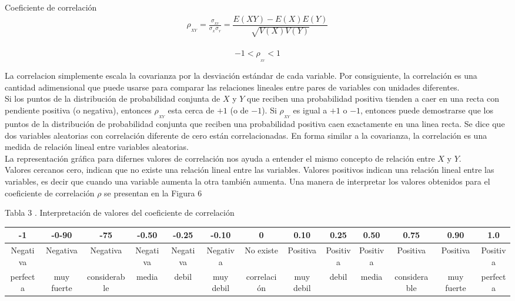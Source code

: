 \documentclass[base=hide,12pt]{elegantbook}
\begin{document}
\vspace{.5cm} 

\begin{Box4}{Coeficiente de correlación}
\begin{eqnarray*}
	\rho_{_{XY}}=\frac{\sigma_{_{XY}}}{\sigma_{_{X}}\sigma_{_{Y}}} = \dfrac{E(XY)-E(X)E(Y)}{\sqrt{V(X)V(Y)}}\\
\end{eqnarray*}

$$-1<\rho_{_{_{XY}}}<1$$
\end{Box4}

\vspace{.5cm}
La correlacion simplemente escala la covarianza por la desviación estándar de cada variable. Por consiguiente, la correlación es una cantidad adimensional que puede usarse para comparar las relaciones lineales entre pares de variables con unidades diferentes.\\
%
Si los puntos de la distribución de probabilidad conjunta de $X$ y $Y$ que reciben una probabilidad positiva tienden a caer en una recta con pendiente positiva (o negativa), entonces $\rho_{_{XY}}$ esta cerca de $+1$ (o de $-1$). Si $\rho_{_{XY}}$ es igual a $+1$ o $-1$, entonces puede demostrarse que los puntos de la distribución de probabilidad conjunta que reciben una probabilidad positiva caen exactamente en una linea recta. Se dice que dos variables aleatorias con correlación diferente de cero están correlacionadas. En forma similar a la covarianza, la correlación es una medida de relación lineal entre variables aleatorias.\\
%
La representación gráfica para difernes valores de correlación nos ayuda a entender el mismo concepto de relación entre $X$ y $Y$.\\

Valores cercanos  cero, indican que no existe una relación lineal entre las variables.  Valores  positivos indican una relación lineal entre las variables, es decir que cuando una variable aumenta la  otra también  aumenta. Una manera de interpretar los valores obtenidos para el coeficiente de correlación $\rho$ se presentan en la Figura  6
%
\begin{center} 
Tabla 3 . Interpretación de valores del coeficiente de correlación \\	
{\tiny 
	\begin{tabular}{|c|c|c|c|c|c|c|c|c|c|c|c|c|}
		\hline 
		-1       & -0-90     & -75         & -0.50     & -0.25    & -0.10     & 0           & 0.10      & 0.25     & 0.50     & 0.75         & 0.90       & 1.0      \\ \hline 
		Negativa & Negativa  & Negativa    & Negativa  & Negativa & Negativa  & No existe   & Positiva  & Positiva & Positiva & Positiva     & Positiva   & Positiva \\ %
		perfecta & muy fuerte& considerable& media	   & debil    & muy debil & correlación & muy debil & debil    & media    & considerable & muy fuerte & perfecta \\ \hline 
	\end{tabular}
}
	\end{center}
\end{document}
